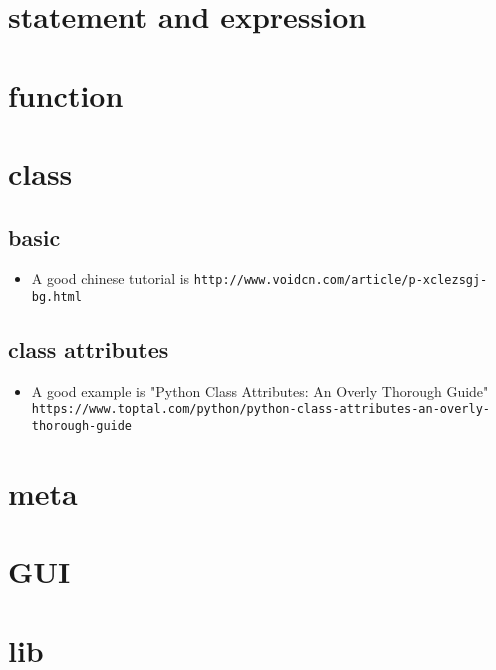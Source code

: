 \documentclass[a4paper,12pt,twoside]{book}
\begin{document}
\chapter{statement and expression}
\chapter{function}
\chapter{class}
\section{basic}
\begin{itemize}
	\item A good chinese tutorial is \verb!http://www.voidcn.com/article/p-xclezsgj-bg.html!
	
\end{itemize}
\section{class attributes}
\begin{itemize}
	
	\item A good example is "Python Class Attributes: An Overly Thorough Guide" \verb!https://www.toptal.com/python/python-class-attributes-an-overly-thorough-guide!
\end{itemize}
\chapter{meta}
\chapter{GUI}

\chapter{lib}




%
\end{document}
